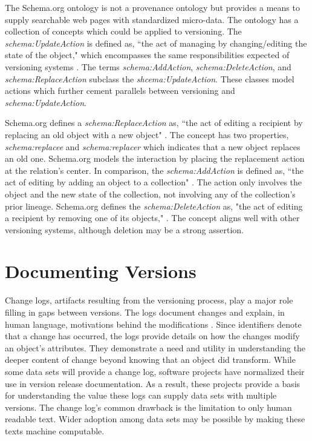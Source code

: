 The Schema.org ontology is not a provenance ontology but provides a means to supply searchable web pages with standardized micro-data.
The ontology has a collection of concepts which could be applied to versioning.
The \textit{schema:UpdateAction} is defined as, ``the act of managing by changing/editing the state of the object," which encompasses the same responsibilities expected of versioning systems \cite{Schema}.
The terms \textit{schema:AddAction}, \textit{schema:DeleteAction}, and \textit{schema:ReplaceAction} subclass the \textit{shcema:UpdateAction}.
These classes model actions which further cement parallels between versioning and \textit{schema:UpdateAction}.

Schema.org defines a \textit{schema:ReplaceAction} as, ``the act of editing a recipient by replacing an old object with a new object" \cite{SchemaRep}.
The concept has two properties, \textit{schema:replacee} and \textit{schema:replacer} which indicates that a new object replaces an old one.
Schema.org models the interaction by placing the replacement action at the relation's center.
In comparison, the \textit{schema:AddAction} is defined as, ``the act of editing by adding an object to a collection" \cite{SchemaAdd}.
The action only involves the object and the new state of the collection, not involving any of the collection's prior lineage.
Schema.org defines the \textit{schema:DeleteAction} as, "the act of editing a recipient by removing one of its objects," \cite{SchemaRem}.
The concept aligns well with other versioning systems, although deletion may be a strong assertion.

\section{Documenting Versions} \label{sec:changelog}

Change logs, artifacts resulting from the versioning process, play a major role filling in gaps between versions.
The logs document changes and explain, in human language, motivations behind the modifications \cite{uel1037}.
Since identifiers denote that a change has occurred, the logs provide details on how the changes modify an object's attributes.
They demonstrate a need and utility in understanding the deeper content of change beyond knowing that an object did transform.
While some data sets will provide a change log, software projects have normalized their use in version release documentation.
As a result, these projects provide a basis for understanding the value these logs can supply data sets with multiple versions.
The change log's common drawback is the limitation to only human readable text.
Wider adoption among data sets may be possible by making these texts machine computable.

